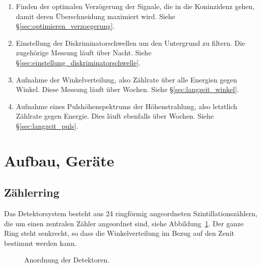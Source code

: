 \documentclass[11pt, ngerman, fleqn, DIV=15, headinclude, BCOR=2cm]{scrreprt}
\begin{document}
\begin{enumerate}
    \item
        Finden der optimalen Verzögerung der Signale, die in die Koninzidenz
        gehen, damit deren Überschneidung maximiert wird. Siehe
        §\ref{sec:optimieren_verzoegerung}.

    \item
        Einstellung der Diskriminatorschwellen um den Untergrund zu filtern.
        Die zugehörige Messung läuft über Nacht. Siehe
        §\ref{sec:einstellung_diskriminatorschwelle}.

    \item
        Aufnahme der Winkelverteilung, also Zählrate über alle Energien gegen
        Winkel. Diese Messung läuft über Wochen. Siehe
        §\ref{sec:langzeit_winkel}.

    \item
        Aufnahme eines Pulshöhenspektrums der Höhenstrahlung, also letztlich
        Zählrate gegen Energie. Dies läuft ebenfalls über Wochen. Siehe
        §\ref{sec:langzeit_puls}.
\end{enumerate}

\section{Aufbau, Geräte}

\subsection{Zählerring}

Das Detektorsystem besteht aus 24 ringförmig angeordneten
Szintillationszählern, die um einen zentralen Zähler angeordnet sind, siehe
Abbildung~\ref{fig:detektoren}. Der ganze Ring steht senkrecht, so dass die
Winkelverteilung im Bezug auf den Zenit bestimmt werden kann.

\begin{figure}[htbp]
    \centering
    \caption{%
        Anordnung der Detektoren.
    }
    \label{fig:detektoren}
\end{figure}
\end{document}
